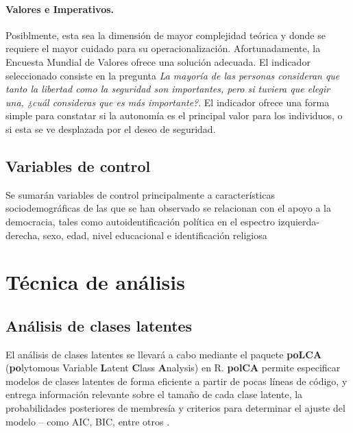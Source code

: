 \documentclass[12pt,twoside]{templates/facsothesis}
\begin{document}
\hypertarget{valores-e-imperativos.}{%
\paragraph{Valores e Imperativos.}\label{valores-e-imperativos.}}

Posiblmente, esta sea la dimensión de mayor complejidad teórica y donde se requiere el mayor cuidado para su operacionalización. Afortunadamente, la Encuesta Mundial de Valores ofrece una solución adecuada. El indicador seleccionado consiste en la pregunta \emph{La mayoría de las personas consideran que tanto la libertad como la seguridad son importantes, pero si tuviera que elegir una, ¿cuál consideras que es más importante?}. El indicador ofrece una forma simple para constatar si la autonomía es el principal valor para los individuos, o si esta se ve desplazada por el deseo de seguridad.

\hypertarget{variables-de-control}{%
\subsection{Variables de control}\label{variables-de-control}}

Se sumarán variables de control principalmente a características sociodemográficas de las que se han observado se relacionan con el apoyo a la democracia, tales como autoidentificación política en el espectro izquierda-derecha, sexo, edad, nivel educacional e identificación religiosa \citep{navia2019, gidron2020, eskelinen2020}

\hypertarget{tuxe9cnica-de-anuxe1lisis}{%
\section{Técnica de análisis}\label{tuxe9cnica-de-anuxe1lisis}}

\hypertarget{anuxe1lisis-de-clases-latentes}{%
\subsection{Análisis de clases latentes}\label{anuxe1lisis-de-clases-latentes}}

El análisis de clases latentes se llevará a cabo mediante el paquete \textbf{poLCA} (\textbf{po}lytomous Variable \textbf{L}atent \textbf{C}lass \textbf{A}nalysis) en R. \textbf{polCA} permite especificar modelos de clases latentes de forma eficiente a partir de pocas líneas de código, y entrega información relevante sobre el tamaño de cada clase latente, la probabilidades posteriores de membresía y criterios para determinar el ajuste del modelo -- como AIC, BIC, entre otros \citep{linzer2011}.
\end{document}
